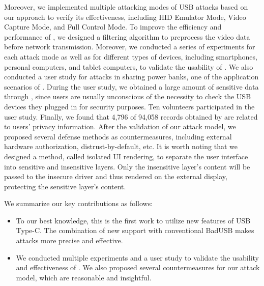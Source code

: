 Moreover, we implemented multiple attacking
modes of \ac{USB} attacks based on our approach to verify its effectiveness,
including \ac{HID} Emulator Mode, Video Capture Mode, and Full Control Mode.  To improve the
efficiency and performance of \tool, we designed a filtering algorithm to
preprocess the video data before network transmission.  Moreover, we conducted
a series of experiments for each attack mode as well as for different types of
devices, including smartphones, personal computers, and tablet computers, to
validate the usability of \tool.  We also conducted a user study for attacks in
sharing power banks, one of the application scenarios of \tool.  During the
user study, we obtained a large amount of sensitive data through \tool, since
users are usually unconscious of the necessity to check the \ac{USB} devices they
plugged in for security purposes.  
Ten volunteers participated in the user study.
Finally, we found that 4,796 of 94,058 records obtained by \tool are related to users' privacy information.
After the validation of our attack model, we
proposed several defense methods as countermeasures, including external
hardware authorization, distrust-by-default, etc.  It is worth noting that we
designed a method, called isolated \ac{UI} rendering, to separate the user interface
into sensitive and insensitive layers.  Only the insensitive layer's content will be passed to the insecure driver and thus rendered on the external display, protecting the sensitive layer's content.

We summarize our key contributions as follows:

\begin{itemize} 
    
    \item To our best knowledge, this is the first work to utilize new features
	of \ac{USB} Type-C.  The combination of new support with conventional BadUSB
	makes attacks more precise and effective.
	
	
    \item We conducted multiple experiments and a user study to validate the
	usability and effectiveness of \tool.  We also proposed several
	countermeasures for our attack model, which are reasonable and
	insightful. 
\end{itemize}

